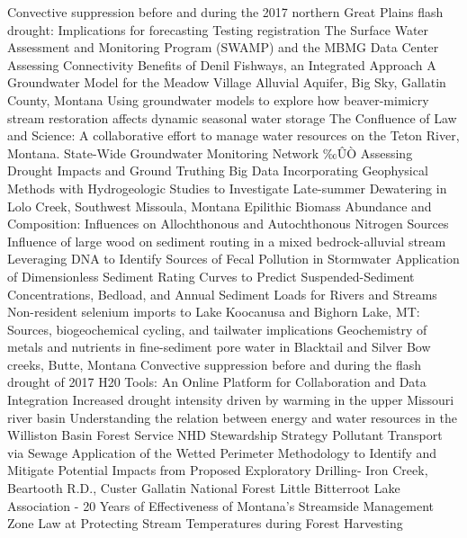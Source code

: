 \documentclass[a4paper]{article}
\begin{document}




\Large
 \begin{center}

\begin{Schunk}
\begin{Soutput}
Convective suppression before and during the 2017 northern Great Plains flash drought: Implications for forecasting 
Testing registration 
The Surface Water Assessment and Monitoring Program (SWAMP) and the MBMG Data Center 
Assessing Connectivity Benefits of Denil Fishways, an Integrated Approach 
A Groundwater Model for the Meadow Village Alluvial Aquifer, Big Sky, Gallatin County, Montana 
Using groundwater models to explore how beaver-mimicry stream restoration affects dynamic seasonal water storage 
The Confluence of Law and Science: A collaborative effort to manage water resources on the Teton River, Montana. 
State-Wide Groundwater Monitoring Network ‰ÛÒ  Assessing Drought Impacts and Ground Truthing Big Data 
Incorporating Geophysical Methods with Hydrogeologic Studies to Investigate Late-summer Dewatering in Lolo Creek, Southwest Missoula, Montana 
Epilithic Biomass Abundance and Composition: Influences on Allochthonous and Autochthonous Nitrogen Sources 
Influence of large wood on sediment routing in a mixed bedrock-alluvial stream 
Leveraging DNA to Identify Sources of Fecal Pollution in Stormwater 
Application of Dimensionless Sediment Rating Curves to Predict Suspended-Sediment Concentrations, Bedload, and Annual Sediment Loads for Rivers and Streams 
Non-resident selenium imports to Lake Koocanusa and Bighorn Lake, MT: Sources, biogeochemical cycling, and tailwater implications 
Geochemistry of metals and nutrients in fine-sediment pore water in Blacktail and Silver Bow creeks, Butte, Montana 
Convective suppression before and during the flash drought of 2017 
H20 Tools: An Online Platform for Collaboration and Data Integration 
Increased drought intensity driven by warming in the upper Missouri river basin 
Understanding the relation between energy and water resources in the Williston Basin 
Forest Service NHD Stewardship Strategy 
Pollutant Transport via Sewage 
Application of the Wetted Perimeter Methodology to Identify and Mitigate Potential Impacts from Proposed Exploratory Drilling- Iron Creek, Beartooth R.D., Custer Gallatin National Forest 
Little Bitterroot Lake Association - 20 Years of 
Effectiveness of Montana's Streamside Management Zone Law at Protecting Stream Temperatures during Forest Harvesting 

\end{Soutput}
\end{Schunk}
\end{center}
\end{document}

